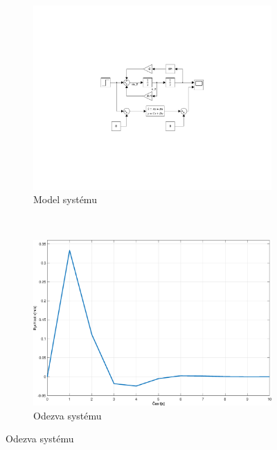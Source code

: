 \documentclass{article}
\begin{document}
\begin{enumerate}
     \begin{figure}[H]
        \centering
        \begin{subfigure}[b]{0.45\textwidth}
            \includegraphics[clip,trim=6.1cm 6.8cm 6.1cm 6.8cm, width=1.00\textwidth]{ARI_HW_0.pdf}
            \caption{Model systému}
        \end{subfigure}
        ~
        \begin{subfigure}[b]{0.45\textwidth}
            \includegraphics[width=\textwidth]{Odezva_10.eps}
            \caption{Odezva systému}
        \end{subfigure}
    \end{figure}
    
\end{enumerate}
\end{document}
